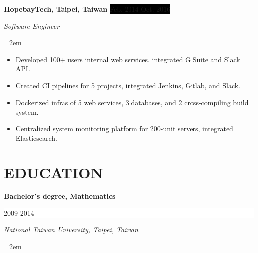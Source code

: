 \documentclass[a4paper, 11pt]{article}
\newcommand{\sepspace}{\vspace*{1em}}		%
\newcommand{\NewPart}[1]{\section*{\uppercase{#1}}}
\newcommand{\EducationEntry}[4]{
		\noindent \textbf{#1} \hfill      %
		\colorbox{White}{%
			\parbox{5cm}{%
			\hfill\color{Black}#2}} \par  %
		\noindent \textit{#3} \par        %
		\noindent\hangindent=2em\hangafter=0 \small #4 %
		\normalsize \par}
\newcommand{\WorkEntry}[4]{				  %
		\noindent \textbf{#1} \hfill      %
		\noindent\colorbox{Black}{\color{White}#2} \par  %
		\noindent \textit{#3} \par              %
		\noindent\hangindent=2em\hangafter=0 \small #4 %
		\normalsize \par}
\begin{document}
\sepspace

\WorkEntry{HopebayTech, Taipei, Taiwan}{Feb. 2014-Oct. 2016}{Software Engineer}{
\begin{itemize}
	\item {Developed 100+ users internal web services, integrated G Suite and Slack API.}
	\item {Created CI pipelines for 5 projects, integrated Jenkins, Gitlab, and Slack.}
	\item {Dockerized infras of 5 web services, 3 databases, and 2 cross-compiling build system.}
	\item {Centralized system monitoring platform for 200-unit servers, integrated Elasticsearch.}
\end{itemize}
}

\NewPart{Education}{}

\EducationEntry{Bachelor's degree, Mathematics}{2009-2014}
{National Taiwan University, Taipei, Taiwan}{}


\end{document}
